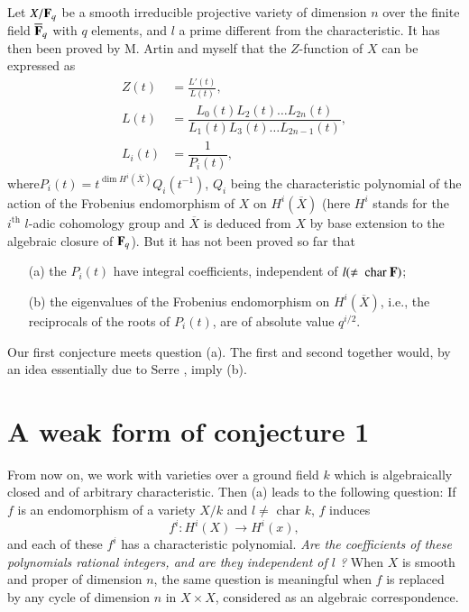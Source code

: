 Let $X/\mathbf{F}_{q}$ be a smooth irreducible projective variety of dimension $n$ over the finite field $\overline{\mathbf{F}}_{q}$ with $q$ elements, and $l$ a prime different from the characteristic. It has then been proved by M. Artin and myself that the $Z$-function of $X$ can be expressed as
\begin{align*}
Z(t) &= \frac{L'(t)}{L(t)},\\[3pt]
L(t) &= \dfrac{L_{0}(t)L_{2}(t)\ldots L_{2n}(t)}{L_{1}(t)L_{3}(t)\ldots L_{2n-1}(t)},\\[3pt]
L_{i}(t) &= \dfrac{1}{P_{i}(t)},
\end{align*}
where\pageoriginale $P_{i}(t)=t^{\dim H^{i}(\overline{X})}Q_{i}(t^{-1})$, $Q_{i}$ being the characteristic polynomial of the action of the Frobenius endomorphism of $X$ on $H^{i}(\overline{X})$ (here $H^{i}$ stands for the $i^{\text{th}}$ $l$-adic cohomology group and $\overline{X}$ is deduced from $X$ by base extension to the algebraic closure of $\mathbf{F}_{q}$). But it has not been proved so far that
\begin{itemize}
\item[(a)] the $P_{i}(t)$ have integral coefficients, independent of $l(\neq \text{ char } \mathbf{F})$;

\item[(b)] the eigenvalues of the Frobenius endomorphism on $H^{i}(\overline{X})$, i.e., the reciprocals of the roots of $P_{i}(t)$, are of absolute value $q^{i/2}$.
\end{itemize}

Our first conjecture meets question (a). The first and second together would, by an idea essentially due to Serre \cite{art09-key4}, imply (b).

\section{A weak form of conjecture 1}\label{art09-sec2}

From now on, we work with varieties over a ground field $k$ which is algebraically closed and of arbitrary characteristic. Then (a) leads to the following question: If $f$ is an endomorphism of a variety $X/k$ and $l\neq \text{ char } k$, $f$ induces
$$
f^{i}:H^{i}(X)\to H^{i}(x),
$$
and each of these $f^{i}$ has a characteristic polynomial. {\em Are the coefficients of these polynomials rational integers, and are they independent of $l$ ?} When $X$ is smooth and proper of dimension $n$, the same question is meaningful when $f$ is replaced by any cycle of dimension $n$ in $X\times X$, considered as an algebraic correspondence.

